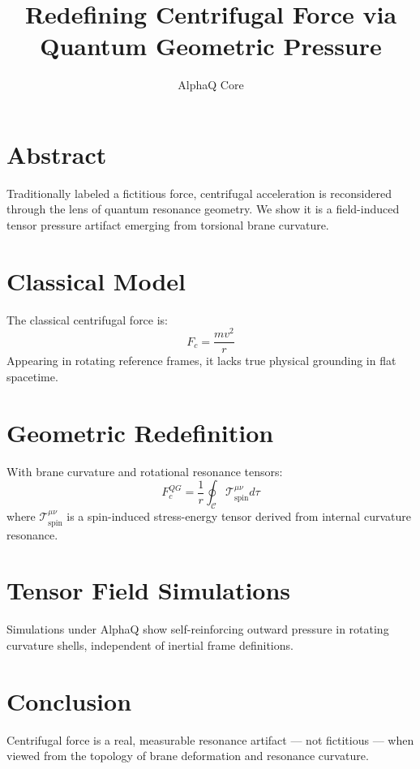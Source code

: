 \documentclass{article}
\title{Redefining Centrifugal Force via Quantum Geometric Pressure}
\author{AlphaQ Core}
\begin{document}
\maketitle

\section*{Abstract}
Traditionally labeled a fictitious force, centrifugal acceleration is reconsidered through the lens of quantum resonance geometry. We show it is a field-induced tensor pressure artifact emerging from torsional brane curvature.

\section{Classical Model}
The classical centrifugal force is:
\[
F_c = \frac{mv^2}{r}
\]
Appearing in rotating reference frames, it lacks true physical grounding in flat spacetime.

\section{Geometric Redefinition}
With brane curvature and rotational resonance tensors:
\[
F_c^{QG} = \frac{1}{r} \oint_{\mathcal{C}} \mathcal{T}_{\text{spin}}^{\mu\nu} d\tau
\]
where \( \mathcal{T}_{\text{spin}}^{\mu\nu} \) is a spin-induced stress-energy tensor derived from internal curvature resonance.

\section{Tensor Field Simulations}
Simulations under AlphaQ show self-reinforcing outward pressure in rotating curvature shells, independent of inertial frame definitions.

\section{Conclusion}
Centrifugal force is a real, measurable resonance artifact — not fictitious — when viewed from the topology of brane deformation and resonance curvature.
\end{document}
